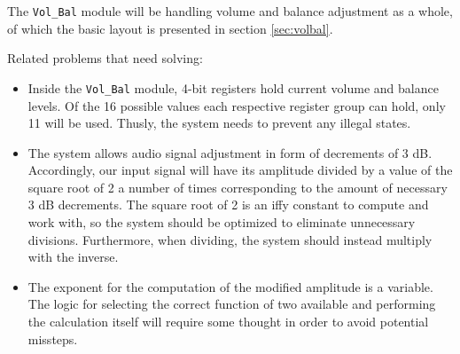 The \verb=Vol_Bal= module will be handling volume and balance adjustment as a whole, of which the basic layout is presented in section \ref{sec:volbal}.

Related problems that need solving:

\begin{itemize}
\item Inside the \verb=Vol_Bal= module, 4-bit registers hold current volume and balance levels. Of the 16 possible values each respective register group can hold, only 11 will be used. Thusly, the system needs to prevent any illegal states.
\item The system allows audio signal adjustment in form of decrements of 3 dB. Accordingly, our input signal will have its amplitude divided by a value of the square root of 2 a number of times corresponding to the amount of necessary 3 dB decrements. The square root of 2 is an iffy constant to compute and work with, so the system should be optimized to eliminate unnecessary divisions. Furthermore, when dividing, the system should instead multiply with the inverse.
\item The exponent for the computation of the modified amplitude is a variable. The logic for selecting the correct function of two available and performing the calculation itself will require some thought in order to avoid potential missteps.
\end{itemize}

